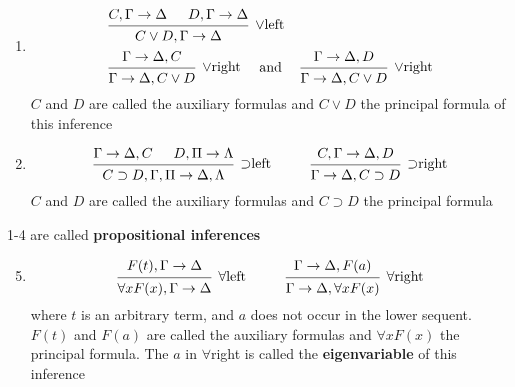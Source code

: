 \documentclass[11pt]{article}
\begin{document}
\begin{enumerate}
\item \begin{align*}
&
\begin{prooftree}[center=false]
\hypo{C,\Gamma\to\Delta}
\hypo{D,\Gamma\to\Delta}
\infer2[\(\vee\)left]{C\vee D,\Gamma\to\Delta}
\end{prooftree}\\&
\begin{prooftree}%
\hypo{\Gamma\to\Delta,C}
\infer1[\(\vee\)right]{\Gamma\to\Delta,C\vee D}
\end{prooftree}\quad\text{ and }\quad
\begin{prooftree}%
\hypo{\Gamma\to\Delta,D}
\infer1[\(\vee\)right]{\Gamma\to\Delta,C\vee D}
\end{prooftree}
\end{align*}
\(C\) and \(D\) are called the auxiliary formulas and \(C\vee D\) the
principal formula of this inference
\item \begin{equation*}
\begin{prooftree}%
\hypo{\Gamma\to\Delta,C}
\hypo{D,\Pi\to \Lambda}
\infer2[\(\supset\)left]{C\supset D,\Gamma,\Pi\to\Delta,\Lambda}
\end{prooftree}\hspace{1cm}
\begin{prooftree}%
\hypo{C,\Gamma\to\Delta,D}
\infer1[\(\supset\)right]{\Gamma\to\Delta,C\supset D}
\end{prooftree}
\end{equation*}
\(C\) and \(D\) are called the auxiliary formulas and \(C\supset D\) the
principal formula
\end{enumerate}


1-4 are called \textbf{propositional inferences}
\begin{enumerate}
\setcounter{enumi}{4}
\item \begin{equation*}
\begin{prooftree}%
\hypo{F(t),\Gamma\to\Delta}
\infer1[\(\forall\)left]{\forall xF(x),\Gamma\to\Delta}
\end{prooftree}\hspace{1cm}
\begin{prooftree}%
\hypo{\Gamma\to\Delta,F(a)}
\infer1[\(\forall\)right]{\Gamma\to\Delta,\forall xF(x)}
\end{prooftree}
\end{equation*}
where \(t\) is an arbitrary term, and \(a\) does not occur in the lower
sequent. \(F(t)\) and \(F(a)\) are called the auxiliary formulas and
\(\forall xF(x)\) the principal formula. The \(a\) in \(\forall\)right is called
the \textbf{eigenvariable} of this inference
\end{enumerate}
\end{document}
